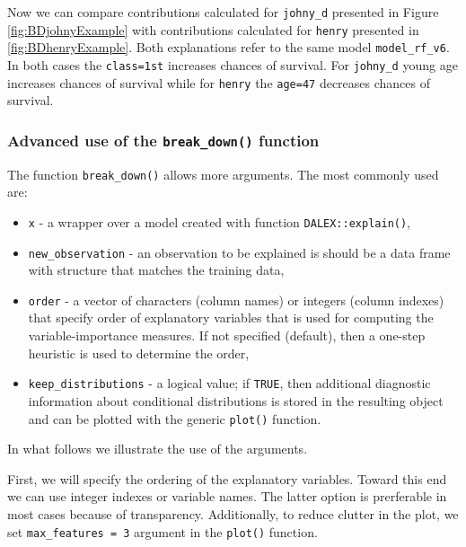 \documentclass[12pt,]{krantz}
\providecommand{\tightlist}{%
  \setlength{\itemsep}{0pt}\setlength{\parskip}{0pt}}
\begin{document}
Now we can compare contributions calculated for \texttt{johny\_d} presented in Figure \ref{fig:BDjohnyExample} with contributions calculated for \texttt{henry} presented in \ref{fig:BDhenryExample}.
Both explanations refer to the same model \texttt{model\_rf\_v6}. In both cases the \texttt{class=1st} increases chances of survival. For \texttt{johny\_d} young age increases chances of survival while for \texttt{henry} the \texttt{age=47} decreases chances of survival.

\hypertarget{advanced-use-of-the-break_down-function}{%
\subsubsection{\texorpdfstring{Advanced use of the \texttt{break\_down()} function}{Advanced use of the break\_down() function}}\label{advanced-use-of-the-break_down-function}}

The function \texttt{break\_down()} allows more arguments. The most commonly used are:

\begin{itemize}
\tightlist
\item
  \texttt{x} - a wrapper over a model created with function \texttt{DALEX::explain()},
\item
  \texttt{new\_observation} - an observation to be explained is should be a data frame with structure that matches the training data,
\item
  \texttt{order} - a vector of characters (column names) or integers (column indexes) that specify order of explanatory variables that is used for computing the variable-importance measures. If not specified (default), then a one-step heuristic is used to determine the order,
\item
  \texttt{keep\_distributions} - a logical value; if \texttt{TRUE}, then additional diagnostic information about conditional distributions is stored in the resulting object and can be plotted with the generic \texttt{plot()} function.
\end{itemize}

In what follows we illustrate the use of the arguments.

First, we will specify the ordering of the explanatory variables. Toward this end we can use integer indexes or variable names. The latter option is prerferable in most cases because of transparency. Additionally, to reduce clutter in the plot, we set \texttt{max\_features\ =\ 3} argument in the \texttt{plot()} function.
\end{document}
